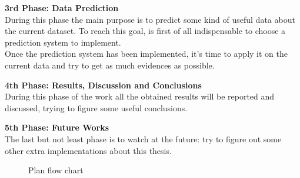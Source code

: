 \newpage

\textbf{3rd Phase: Data Prediction}\\
During this phase the main purpose is to predict some kind of useful data about the current dataset. To reach this goal, is first of all indispensable to choose a prediction system to implement. \\
Once the prediction system has been implemented, it's time to apply it on the current data and try to get as much evidences as possible.

\textbf{4th Phase: Results, Discussion and Conclusions }\\
During this phase of the work all the obtained results will be reported and discussed, trying to figure some useful conclusions.

\textbf{5th Phase: Future Works}\\
The last but not least phase is to watch at the future: try to figure out some other extra implementations about this thesis.\\

\begin{figure}[h]

    \caption[Plan flow chart]{Plan flow chart}
    \label{fig: Development_Flow}
\end{figure}


